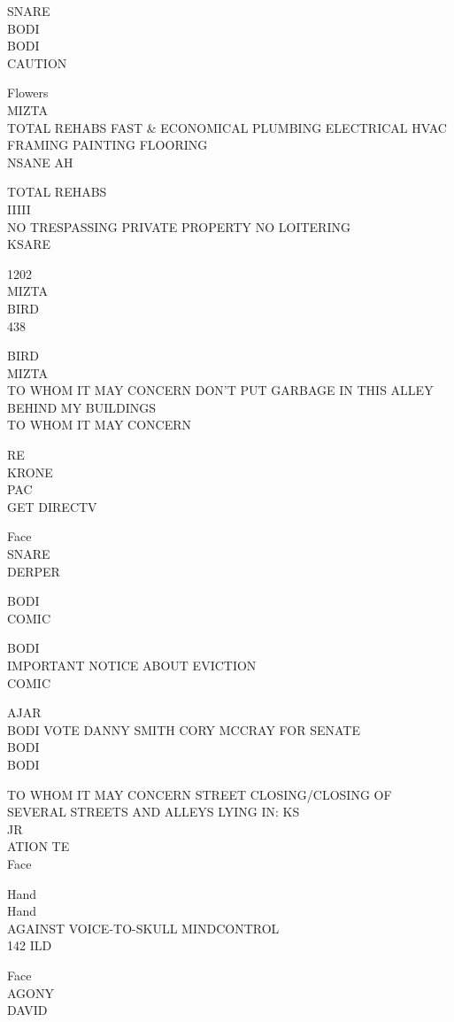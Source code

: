 \documentclass[10pt,letterpaper]{article}
\begin{document}
SNARE\\
BODI\\
BODI\\
CAUTION

Flowers\\
MIZTA\\
TOTAL REHABS FAST \& ECONOMICAL PLUMBING ELECTRICAL HVAC FRAMING PAINTING FLOORING\\
NSANE AH

TOTAL REHABS\\
IIIII\\
NO TRESPASSING PRIVATE PROPERTY NO LOITERING\\
KSARE

1202\\
MIZTA\\
BIRD\\
438

BIRD\\
MIZTA\\
TO WHOM IT MAY CONCERN DON'T PUT GARBAGE IN THIS ALLEY BEHIND MY BUILDINGS\\
TO WHOM IT MAY CONCERN

RE\\
KRONE\\
PAC\\
GET DIRECTV

Face\\
SNARE\\
DERPER

BODI\\
COMIC

BODI\\
IMPORTANT NOTICE ABOUT EVICTION\\
COMIC

AJAR\\
BODI VOTE DANNY SMITH CORY MCCRAY FOR SENATE\\
BODI\\
BODI

TO WHOM IT MAY CONCERN STREET CLOSING/CLOSING OF SEVERAL STREETS AND ALLEYS LYING IN: KS\\
JR\\
ATION TE\\
Face

Hand\\
Hand\\
AGAINST VOICE{-}TO{-}SKULL MINDCONTROL\\
142 ILD

Face\\
AGONY\\
DAVID
\end{document}
